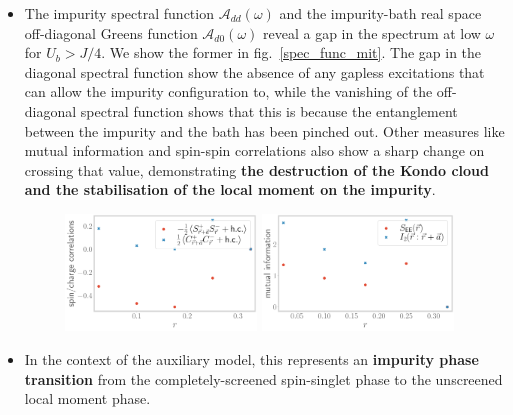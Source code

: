 \documentclass{report}
\numberwithin{equation}{section}
\begin{document}
\begin{itemize}
\item The impurity spectral function \(\mathcal{A}_{dd}(\omega)\) and the impurity-bath real space off-diagonal Greens function \(\mathcal{A}_{d0}(\omega)\) reveal a gap in the spectrum at low \(\omega\) for \(U_b > J/4\). We show the former in fig.~\ref{spec_func_mit}. The gap in the diagonal spectral function show the absence of any gapless excitations that can allow the impurity configuration to, while the vanishing of the off-diagonal spectral function shows that this is because the entanglement between the impurity and the bath has been pinched out. Other measures like mutual information and spin-spin correlations also show a sharp change on crossing that value, demonstrating \textbf{the destruction of the Kondo cloud and the stabilisation of the local moment on the impurity}.

\begin{figure}[!htb]
\centering
	\includegraphics[width=0.48\textwidth]{../figures/spin-charge-corr-full.pdf}
	\includegraphics[width=0.48\textwidth]{../figures/impEE-mutinfo-d0.pdf}
\end{figure}

	\item In the context of the auxiliary model, this represents an \textbf{impurity phase transition} from the completely-screened spin-singlet phase to the unscreened local moment phase.


\end{itemize}
\end{document}
